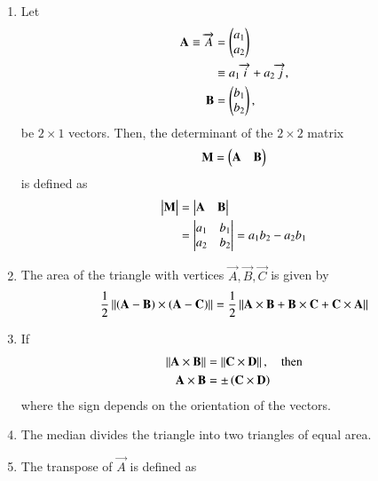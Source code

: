 \begin{enumerate}[label=\thesection.\arabic*.,ref=\thesection.\theenumi]
\item Let 
\begin{align}
  \mathbf{A} \equiv \overrightarrow{A} &= \begin{pmatrix}a_1\\a_2\end{pmatrix} 
  \\
  &\equiv a_1\overrightarrow{i}+a_2\overrightarrow{j}, 
  \\
  \mathbf{B} &= \begin{pmatrix}b_1\\b_2\end{pmatrix}, 
\end{align}
be $2 \times 1$ vectors.
Then, the determinant of the $2 \times 2$ matrix 
\begin{align}  
  \mathbf{M} = \begin{pmatrix}\mathbf{A} & \mathbf{B}\end{pmatrix}
\end{align}
is defined as
\begin{align}
  \label{eq:det2d}
  \begin{vmatrix}\mathbf{M}\end{vmatrix} &= \begin{vmatrix}\mathbf{A} & \mathbf{B}\end{vmatrix} 
  \\
  &= \begin{vmatrix}a_1 & b_1\\a_2 & b_2\end{vmatrix} = a_1b_2 - a_2 b_1
\end{align}
%
\item The area of the triangle with vertices $\vec{A}, \vec{B}, \vec{C}$ is given by 
	\label{prop:area2d}
\begin{align}
  \label{eq:area2d}
	\frac{1}{2}\left\lVert\left(\mathbf{A}-\mathbf{B}\right) \times \left(\mathbf{A}-\mathbf{C}\right)\right\rVert
 = 
 \frac{1}{2}\left\lVert\mathbf{A} \times \mathbf{B}+\mathbf{B} \times \mathbf{C}+\mathbf{C} \times \mathbf{A}\right\rVert
  \end{align}
  \item If 
  \label{prop:area2d-norm}
\begin{align}
  \label{eq:area2d-norm}
	\left\lVert\mathbf{A}\times\mathbf{B}\right\rVert  &= \left\lVert\mathbf{C}\times \mathbf{D}\right\rVert, \quad \text{then}
	\\
	\mathbf{A}\times\mathbf{B}  &= \pm\left(\mathbf{C}\times \mathbf{D}\right)
  \end{align}
  where the sign depends on the orientation of the vectors.
  \item The median divides the triangle into two triangles of equal area.
	  \label{prop:two-median-area}
  \item  The transpose of $\vec{A}$ is defined as
\begin{align}

\end{align}
\end{enumerate}
